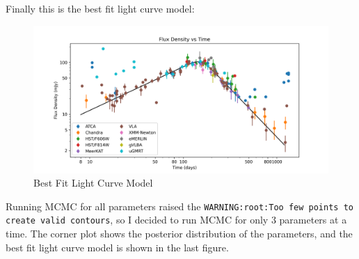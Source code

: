 \clearpage

Finally this is the best fit light curve model:

\begin{figure}[H]
	\centering
	\includegraphics[width=\textwidth]{Images/Best_fit_model.png}
	\caption{Best Fit Light Curve Model}
	\label{fig:light_curve_model}
\end{figure}

Running MCMC for all parameters raised the \verb|WARNING:root:Too few points to create valid contours|, so I decided to run MCMC for only 3 parameters at a time. The corner plot shows the posterior distribution of the parameters, and the best fit light curve model is shown in the last figure.


